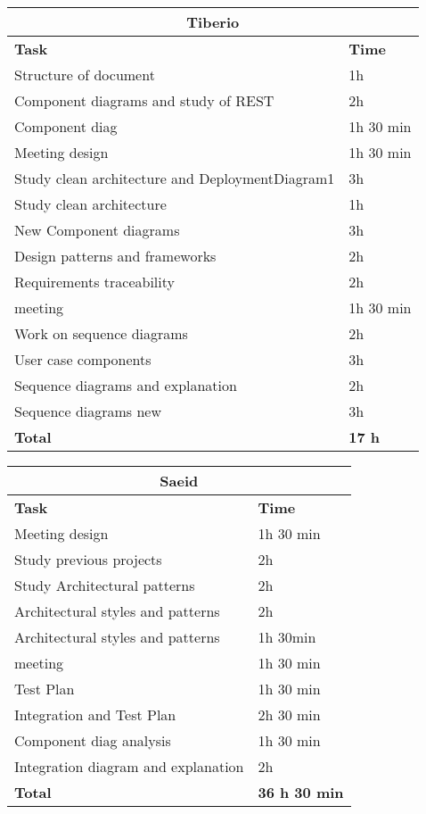 \begin{table}[H]
\begin{tabular}{|l|l|}
\hline
\multicolumn{2}{|c|}{\textbf{Tiberio}}            \\ \hline
\textbf{Task}                   & \textbf{Time} \\ \hline
Structure of document                & 1h      \\ \hline
Component diagrams and study of REST       & 2h      \\ \hline
Component diag & 1h 30 min \\ \hline
Meeting design & 1h 30 min \\ \hline
Study clean architecture and DeploymentDiagram1 & 3h \\ \hline
Study clean architecture & 1h \\ \hline
New Component diagrams & 3h \\ \hline
Design patterns and frameworks & 2h \\ \hline
Requirements traceability & 2h \\ \hline
meeting & 1h 30 min \\ \hline
Work on sequence diagrams & 2h \\ \hline
User case components & 3h \\ \hline
Sequence diagrams and explanation & 2h \\ \hline
Sequence diagrams new & 3h \\ \hline

\rowcolor {polilight}
\textbf{Total}                  & \textbf{17 h}   \\ \hline
\end{tabular}
\end{table}


\begin{table}[H]
\begin{tabular}{|l|l|}
\hline
\multicolumn{2}{|c|}{\textbf{Saeid}}            \\ \hline
\textbf{Task}                   & \textbf{Time} \\ \hline
Meeting design & 1h 30 min \\ \hline
Study previous projects & 2h \\ \hline
Study Architectural  patterns & 2h \\ \hline
Architectural styles and patterns & 2h \\ \hline
Architectural styles and patterns & 1h 30min \\ \hline
meeting & 1h  30 min \\ \hline
Test Plan & 1h  30 min \\ \hline
Integration and Test Plan & 2h  30 min \\ \hline
Component diag analysis & 1h  30 min \\ \hline
Integration diagram and explanation & 2h \\ \hline

\rowcolor {polilight}
\textbf{Total}                  & \textbf{36 h 30 min}   \\ \hline
\end{tabular}
\end{table}
